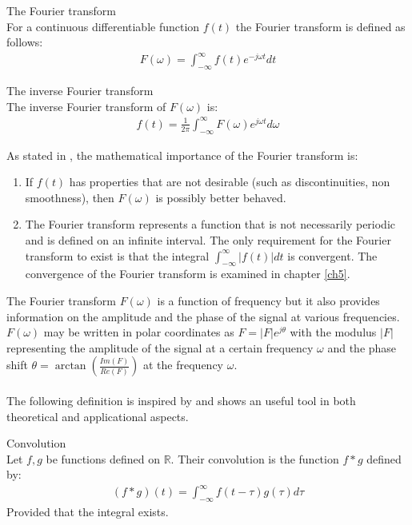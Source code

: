 \begin{definition}{The Fourier transform} \label{def:Fourier_trans}
\\
For a continuous differentiable function $f(t)$ the Fourier transform is defined as follows:
\begin{align*}
F(\omega) = \int_{-\infty}^\infty f(t) e^{-j \omega t} dt
\end{align*}
\end{definition}

\begin{definition}{The inverse Fourier transform} \label{def:InverseFourier_trans}
\\
The inverse Fourier transform of $F(\omega)$ is:
\begin{align*}
f(t) = \frac{1}{2\pi} \int_{-\infty}^\infty F(\omega) e^{j \omega t} d\omega
\end{align*}
\end{definition}

\noindent
As stated in \cite{FourierTrans}, the mathematical importance of the Fourier transform is:
\begin{enumerate}
\item If $f(t)$ has properties that are not desirable (such as discontinuities, non smoothness), then $F(\omega)$ is possibly better behaved.
\item The Fourier transform represents a function that is not necessarily periodic and is defined on an infinite interval. The only requirement for the Fourier transform to exist is that the integral $\int_{-\infty}^\infty |f(t)| dt$ is convergent. The convergence of the Fourier transform is examined in chapter \ref{ch5}.
\end{enumerate}

\noindent
The Fourier transform $F(\omega)$ is a function of frequency but it also provides information on the amplitude and the phase of the signal at various frequencies. $F(\omega)$ may be written in polar coordinates as $F = |F|e^{j\theta}$ with the modulus $|F|$ representing the amplitude of the signal at a certain frequency $\omega$ and the phase shift $\theta = \arctan \left(\frac{Im(F)}{Re(F)} \right)$ at the frequency $\omega$.
\\ \\
The following definition is inspired by \cite{page 206, FAA} and shows an useful tool in both theoretical and applicational aspects.
\begin{definition}{Convolution} \label{def:Convol}
\\
Let $f,g$ be functions defined on $\mathbb{R}$. Their convolution is the function $f*g$ defined by:
\begin{align*}
(f*g)(t) = \int_{-\infty}^\infty f(t-\tau) g(\tau) d\tau
\end{align*}
Provided that the integral exists.
\end{definition}

